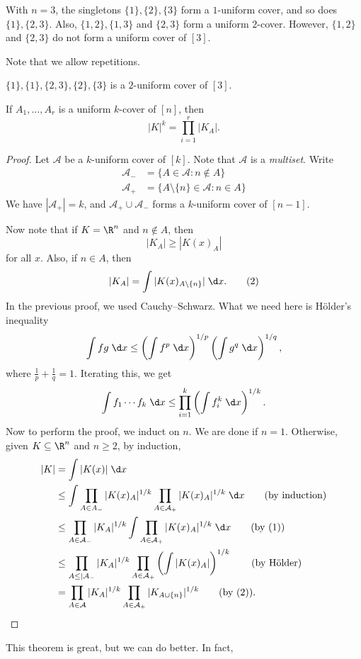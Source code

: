 \documentclass[a4paper]{article}
\begin{document}
\begin{eg}
  With $n = 3$, the singletons $\{1\}, \{2\}, \{3\}$ form a $1$-uniform cover, and so does $\{1\}, \{2, 3\}$. Also, $\{1, 2\}, \{1, 3\}$ and $\{2, 3\}$ form a uniform $2$-cover. However, $\{1, 2\}$ and $\{2, 3\}$ do not form a uniform cover of $[3]$.
\end{eg}
Note that we allow repetitions.
\begin{eg}
  $\{1\}, \{1\}, \{2, 3\}, \{2\}, \{3\}$ is a $2$-uniform cover of $[3]$.
\end{eg}

\begin{thm}
  If $A_1, \ldots, A_r$ is a uniform $k$-cover of $[n]$, then
  \[
    |K|^k = \prod_{i = 1}^r |K_A|.
  \]
\end{thm}

\begin{proof}
  Let $\mathcal{A}$ be a $k$-uniform cover of $[k]$. Note that $\mathcal{A}$ is a \emph{multiset}. Write
  \begin{align*}
    \mathcal{A}_- &= \{A \in \mathcal{A}: n \not \in A\}\\
    \mathcal{A}_+ &= \{A \setminus \{n\} \in \mathcal{A}: n \in A\}
  \end{align*}
  We have $|\mathcal{A}_+| = k$, and $\mathcal{A}_+ \cup \mathcal{A}_-$ forms a $k$-uniform cover of $[n - 1]$.

  Now note that if $K = \R^n$ and $n \not \in A$, then
  \[
    |K_A| \geq |K(x)_A|\tag{1}
  \]
  for all $x$. Also, if $n \in A$, then
  \[
    |K_A| = \int |K(x)_{A \setminus \{n\}}|\;\d x.\tag{2}
  \]
  In the previous proof, we used Cauchy--Schwarz. What we need here is H\"older's inequality
  \[
    \int fg\;\d x \leq \left(\int f^p\;\d x\right)^{1/p} \left(\int g^q\;\d x\right)^{1/q},
  \]
  where $\frac{1}{p} + \frac{1}{q} = 1$. Iterating this, we get
  \[
    \int f_1 \cdots f_k\;\d x\leq \prod_{i = 1}^k \left(\int f_i^k\;\d x\right)^{1/k}.
  \]
  Now to perform the proof, we induct on $n$. We are done if $n = 1$. Otherwise, given $K \subseteq \R^n$ and $n \geq 2$, by induction,
  \begin{align*}
    |K| &= \int |K(x)|\;\d x \\
    &\leq \int \prod_{A \in A_-} |K(x)_A|^{1/k} \prod_{A \in \mathcal{A}_+} |K(x)_A|^{1/k}\;\d x\tag{by induction}\\
    &\leq \prod_{A \in \mathcal{A}_-} |K_A|^{1/k} \int \prod_{A \in \mathcal{A}_+}|K(x)_A|^{1/k}\;\d x\tag{by (1)}\\
    &\leq \prod_{A \leq |\mathcal{A}_-} |K_A|^{1/k} \prod_{A \in \mathcal{A}_+} \left(\int |K(x)_A|\right)^{1/k} \tag{by H\"older}\\
    &= \prod_{A \in \mathcal{A}} |K_A|^{1/k} \prod_{A \in \mathcal{A}_+} |K_{A \cup \{n\}}|^{1/k}\tag{by (2)}.\qedhere
  \end{align*}
\end{proof}
This theorem is great, but we can do better. In fact,
\end{document}
